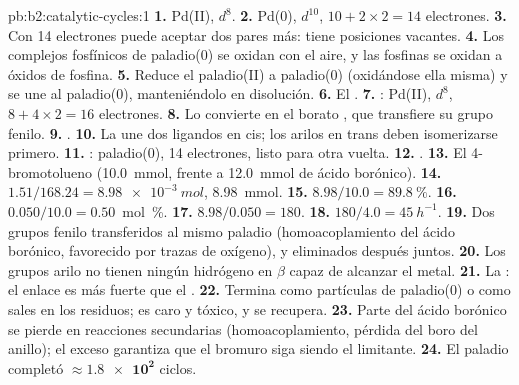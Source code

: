 \begin{solution}{pb:b2:catalytic-cycles:1}
\textbf{1.} Pd(II), $d^8$.
\textbf{2.} Pd(0), $d^{10}$, $10 + 2 \times 2 = 14$ electrones.
\textbf{3.} Con 14 electrones puede aceptar dos pares más: tiene posiciones vacantes.
\textbf{4.} Los complejos fosfínicos de paladio(0) se oxidan con el aire, y las fosfinas se
oxidan a óxidos de fosfina.
\textbf{5.} Reduce el paladio(II) a paladio(0) (oxidándose ella misma) y se une al
paladio(0), manteniéndolo en disolución.
\textbf{6.} El .
\textbf{7.} : Pd(II), $d^8$, $8 + 4 \times 2 =
16$ electrones.
\textbf{8.} Lo convierte en el borato , que transfiere su grupo fenilo.
\textbf{9.} .
\textbf{10.} La  une dos ligandos en cis; los arilos en trans deben isomerizarse primero.
\textbf{11.} : paladio(0), 14 electrones, listo
para otra vuelta.
\textbf{12.} .
\textbf{13.} El 4-bromotolueno (\qty{10.0}{mmol}, frente a \qty{12.0}{mmol} de ácido borónico).
\textbf{14.} $1.51/168.24 = \qty{8.98e-3}{mol}$, \qty{8.98}{mmol}.
\textbf{15.} $8.98/10.0 = 89.8~\%$.
\textbf{16.} $0.050/10.0 = 0.50$~mol~\%.
\textbf{17.} $8.98/0.050 = 180$.
\textbf{18.} $180/4.0 = \qty{45}{h^{-1}}$.
\textbf{19.} Dos grupos fenilo transferidos al mismo paladio (homoacoplamiento del
ácido borónico, favorecido por trazas de oxígeno), y eliminados después juntos.
\textbf{20.} Los grupos arilo no tienen ningún hidrógeno en $\beta$ capaz de alcanzar el metal.
\textbf{21.} La : el enlace  es más fuerte que el .
\textbf{22.} Termina como partículas de paladio(0) o como sales en los residuos; es caro y
tóxico, y se recupera.
\textbf{23.} Parte del ácido borónico se pierde en reacciones secundarias (homoacoplamiento, pérdida del boro
del anillo); el exceso garantiza que el bromuro siga siendo el limitante.
\textbf{24.} El paladio completó $\boldsymbol{\approx \num{1.8e2}}$ ciclos.
\end{solution}
